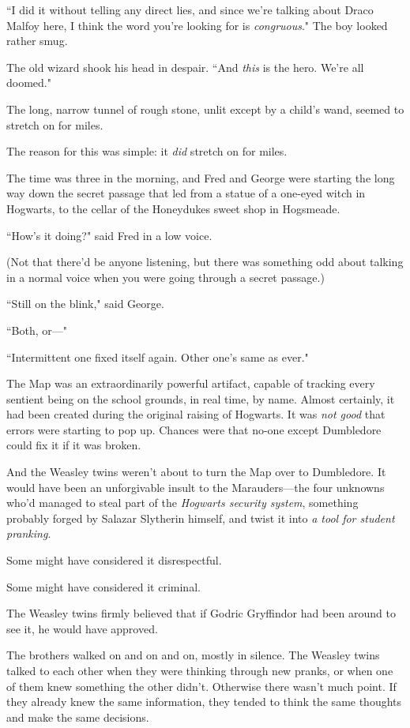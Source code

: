 ``I did it without telling any direct lies, and since we're talking about Draco Malfoy here, I think the word you're looking for is \emph{congruous}." The boy looked rather smug.

The old wizard shook his head in despair. ``And \emph{this} is the hero. We're all doomed."


The long, narrow tunnel of rough stone, unlit except by a child's wand, seemed to stretch on for miles.

The reason for this was simple: it \emph{did} stretch on for miles.

The time was three in the morning, and Fred and George were starting the long way down the secret passage that led from a statue of a one-eyed witch in Hogwarts, to the cellar of the Honeydukes sweet shop in Hogsmeade.

``How's it doing?" said Fred in a low voice.

(Not that there'd be anyone listening, but there was something odd about talking in a normal voice when you were going through a secret passage.)

``Still on the blink," said George.

``Both, or—"

``Intermittent one fixed itself again. Other one's same as ever."

The Map was an extraordinarily powerful artifact, capable of tracking every sentient being on the school grounds, in real time, by name. Almost certainly, it had been created during the original raising of Hogwarts. It was \emph{not good} that errors were starting to pop up. Chances were that no-one except Dumbledore could fix it if it was broken.

And the Weasley twins weren't about to turn the Map over to Dumbledore. It would have been an unforgivable insult to the Marauders—the four unknowns who'd managed to steal part of the \emph{Hogwarts security system}, something probably forged by Salazar Slytherin himself, and twist it into \emph{a tool for student pranking}.

Some might have considered it disrespectful.

Some might have considered it criminal.

The Weasley twins firmly believed that if Godric Gryffindor had been around to see it, he would have approved.

The brothers walked on and on and on, mostly in silence. The Weasley twins talked to each other when they were thinking through new pranks, or when one of them knew something the other didn't. Otherwise there wasn't much point. If they already knew the same information, they tended to think the same thoughts and make the same decisions.

